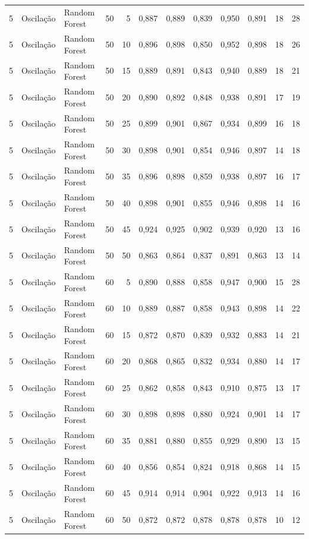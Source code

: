 \begin{longtable}{@{}rllrrrrrrrrr@{}}
5 & Oscilação & Random Forest & 50 & 5 & 0,887 & 0,889 & 0,839 & 0,950 & 0,891 & 18 & 28 \\
5 & Oscilação & Random Forest & 50 & 10 & 0,896 & 0,898 & 0,850 & 0,952 & 0,898 & 18 & 26 \\
5 & Oscilação & Random Forest & 50 & 15 & 0,889 & 0,891 & 0,843 & 0,940 & 0,889 & 18 & 21 \\
5 & Oscilação & Random Forest & 50 & 20 & 0,890 & 0,892 & 0,848 & 0,938 & 0,891 & 17 & 19 \\
5 & Oscilação & Random Forest & 50 & 25 & 0,899 & 0,901 & 0,867 & 0,934 & 0,899 & 16 & 18 \\
5 & Oscilação & Random Forest & 50 & 30 & 0,898 & 0,901 & 0,854 & 0,946 & 0,897 & 14 & 18 \\
5 & Oscilação & Random Forest & 50 & 35 & 0,896 & 0,898 & 0,859 & 0,938 & 0,897 & 16 & 17 \\
5 & Oscilação & Random Forest & 50 & 40 & 0,898 & 0,901 & 0,855 & 0,946 & 0,898 & 14 & 16 \\
5 & Oscilação & Random Forest & 50 & 45 & 0,924 & 0,925 & 0,902 & 0,939 & 0,920 & 13 & 16 \\
5 & Oscilação & Random Forest & 50 & 50 & 0,863 & 0,864 & 0,837 & 0,891 & 0,863 & 13 & 14 \\
5 & Oscilação & Random Forest & 60 & 5 & 0,890 & 0,888 & 0,858 & 0,947 & 0,900 & 15 & 28 \\
5 & Oscilação & Random Forest & 60 & 10 & 0,889 & 0,887 & 0,858 & 0,943 & 0,898 & 14 & 22 \\
5 & Oscilação & Random Forest & 60 & 15 & 0,872 & 0,870 & 0,839 & 0,932 & 0,883 & 14 & 21 \\
5 & Oscilação & Random Forest & 60 & 20 & 0,868 & 0,865 & 0,832 & 0,934 & 0,880 & 14 & 17 \\
5 & Oscilação & Random Forest & 60 & 25 & 0,862 & 0,858 & 0,843 & 0,910 & 0,875 & 13 & 17 \\
5 & Oscilação & Random Forest & 60 & 30 & 0,898 & 0,898 & 0,880 & 0,924 & 0,901 & 14 & 17 \\
5 & Oscilação & Random Forest & 60 & 35 & 0,881 & 0,880 & 0,855 & 0,929 & 0,890 & 13 & 15 \\
5 & Oscilação & Random Forest & 60 & 40 & 0,856 & 0,854 & 0,824 & 0,918 & 0,868 & 14 & 15 \\
5 & Oscilação & Random Forest & 60 & 45 & 0,914 & 0,914 & 0,904 & 0,922 & 0,913 & 14 & 16 \\
5 & Oscilação & Random Forest & 60 & 50 & 0,872 & 0,872 & 0,878 & 0,878 & 0,878 & 10 & 12 \\

\end{longtable}
